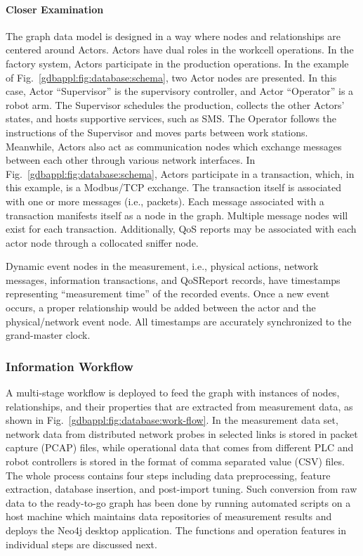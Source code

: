 \paragraph{Closer Examination}
The graph data model is designed in a way where nodes and relationships are centered around Actors. Actors have dual roles in the workcell operations. In the factory system, Actors participate in the production operations.
In the example of Fig.~\ref{gdbappl:fig:database:schema}, two Actor nodes are presented. In this case, Actor ``Supervisor'' is the supervisory controller, and Actor ``Operator'' is a robot arm. The Supervisor schedules the production, collects the other Actors' states, and hosts supportive services, such as SMS. The Operator follows the instructions of the Supervisor and moves parts between work stations. Meanwhile, Actors also act as communication nodes which exchange messages between each other through various network interfaces. In Fig.~\ref{gdbappl:fig:database:schema}, Actors participate in a transaction, which, in this example, is a Modbus/TCP exchange. The transaction itself is associated with one or more messages (i.e., packets). Each message associated with a transaction manifests itself as a node in the graph. Multiple message nodes will exist for each transaction. Additionally, QoS reports may be associated with each actor node through a collocated sniffer node.  %

Dynamic event nodes in the measurement, i.e., physical actions, network messages, information transactions, and QoSReport records, have timestamps representing ``measurement time'' of the recorded events. Once a new event occurs, a proper relationship would be added between the actor and the physical/network event node. All timestamps are accurately synchronized to the grand-master clock.


\subsubsection{Information Workflow}

A multi-stage workflow is deployed to feed the graph with instances of nodes, relationships, and their properties that are extracted from measurement data, as shown in Fig.~\ref{gdbappl:fig:database:work-flow}. In the measurement data set, network data from distributed network probes in selected links is stored in packet capture (PCAP) files, while operational data that comes from different PLC and robot controllers is stored in the format of comma separated value (CSV) files. The whole process contains four steps including data preprocessing, feature extraction, database insertion, and post-import tuning. Such conversion from raw data to the ready-to-go graph has been done  by running automated scripts on a host machine which maintains data repositories of measurement results and deploys the Neo4j desktop application. The functions and operation features in individual steps are discussed next. 



